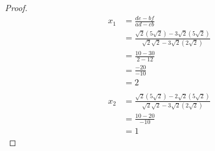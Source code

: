 \documentclass[11pt]{scrartcl}
\begin{document}
\begin{enumerate}[label=\alph*.]
{	      }
	      \begin{proof}
		      \begin{align*}
			      x_1 & = \frac{de-bf}{ad-cb}                                                        \\
			          & = \frac{\sqrt2(5\sqrt2) - 3\sqrt2(5\sqrt2)}{\sqrt2\sqrt2 - 3\sqrt2(2\sqrt2)} \\
			          & = \frac{10 - 30}{2-12}                                                       \\
			          & = \frac{-20}{-10}                                                            \\
			          & = 2                                                                          \\
			          &                                                                              \\
			      x_2 & = \frac{\sqrt2(5\sqrt2) - 2\sqrt2(5\sqrt2)}{\sqrt2\sqrt2 - 3\sqrt2(2\sqrt2)} \\
			          & = \frac{10-20}{-10}                                                          \\
			          & = 1
		      \end{align*}
	      \end{proof}
\end{enumerate}




\section{}

\section{}


\section{}
\end{document}
